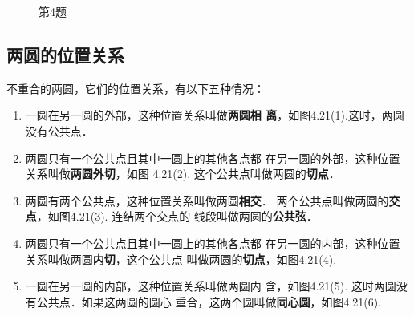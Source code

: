 \begin{figure}[htp]
    \centering
{}
    \caption*{第4题}
\end{figure}

\subsection{两圆的位置关系}
不重合的两圆，它们的位置关系，有以下五种情况：
\begin{enumerate}
\item 一圆在另一圆的外部，这种位置关系叫做\textbf{两圆相
离}，如图4.21(1).这时，两圆没有公共点．
\item 两圆只有一个公共点且其中一圆上的其他各点都
在另一圆的外部，这种位置关系叫做\textbf{两圆外切}，如图
4.21(2). 这个公共点叫做两圆的\textbf{切点}．
\item 两圆有两个公共点，这种位置关系叫做两圆\textbf{相交}．
两个公共点叫做两圆的\textbf{交点}，如图4.21(3). 连结两个交点的
线段叫做两圆的\textbf{公共弦}．
\item 两圆只有一个公共点且其中一圆上的其他各点都
在另一圆的内部，这种位置关系叫做两圆\textbf{内切}，这个公共点
叫做两圆的\textbf{切点}，如图4.21(4).
\item 一圆在另一圆的内部，这种位置关系叫做两圆内
含，如图4.21(5). 这时两圆没有公共点．如果这两圆的圆心
重合，这两个圆叫做\textbf{同心圆}，如图4.21(6).
\end{enumerate}

